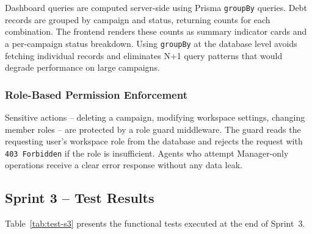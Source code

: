 \documentclass[12pt,a4paper]{report}
\begin{document}
Dashboard queries are computed server-side using Prisma \texttt{groupBy} queries.
Debt records are grouped by campaign and status, returning counts for each
combination.
The frontend renders these counts as summary indicator cards and a per-campaign status
breakdown.
Using \texttt{groupBy} at the database level avoids fetching individual records and
eliminates N+1 query patterns that would degrade performance on large campaigns.

\subsubsection{Role-Based Permission Enforcement}

Sensitive actions -- deleting a campaign, modifying workspace settings, changing
member roles -- are protected by a role guard middleware.
The guard reads the requesting user's workspace role from the database and rejects
the request with \texttt{403 Forbidden} if the role is insufficient.
Agents who attempt Manager-only operations receive a clear error response without any
data leak.

\FloatBarrier

\subsection{Sprint 3 -- Test Results}

Table~\ref{tab:test-s3} presents the functional tests executed at the end of Sprint~3.
\end{document}
